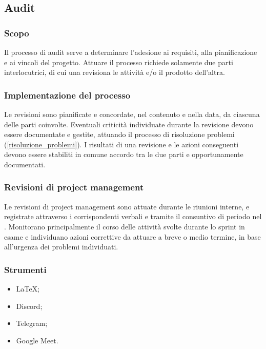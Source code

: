 \subsection{Audit}\label{audit}

\subsubsection{Scopo}
\par Il processo di audit serve a determinare l'adesione ai requisiti, alla pianificazione e ai vincoli del progetto. Attuare il processo richiede solamente due parti interlocutrici, di cui una revisiona le attività e/o il prodotto dell'altra.

\subsubsection{Implementazione del processo}
\par Le revisioni sono pianificate e concordate, nel contenuto e nella data, da ciascuna delle parti coinvolte. Eventuali criticità individuate durante la revisione devono essere documentate e gestite, attuando il processo di risoluzione problemi (\ref{risoluzione_problemi}). I risultati di una revisione e le azioni conseguenti devono essere stabiliti in comune accordo tra le due parti e opportunamente documentati.

\subsubsection{Revisioni di project management}
\par Le revisioni di project management sono attuate durante le riunioni interne, e registrate attraverso i corrispondenti verbali e tramite il consuntivo di periodo nel \PdP. Monitorano principalmente il corso delle attività svolte durante lo sprint in esame e individuano azioni correttive da attuare a breve o medio termine, in base all'urgenza dei problemi individuati.

\subsubsection{Strumenti}
\IntroStrumenti
\begin{itemize}
  \item LaTeX;
  \item Discord;
  \item Telegram;
  \item Google Meet.
\end{itemize}
